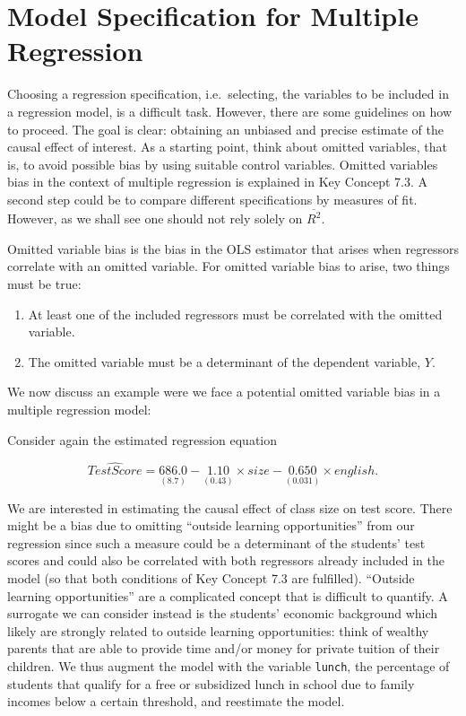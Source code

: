 \documentclass[]{book}
\theoremstyle{definition}
\theoremstyle{definition}
\theoremstyle{definition}
\theoremstyle{remark}
\begin{document}
\section{Model Specification for Multiple
Regression}\label{model-specification-for-multiple-regression}

Choosing a regression specification, i.e.~selecting, the variables to be
included in a regression model, is a difficult task. However, there are
some guidelines on how to proceed. The goal is clear: obtaining an
unbiased and precise estimate of the causal effect of interest. As a
starting point, think about omitted variables, that is, to avoid
possible bias by using suitable control variables. Omitted variables
bias in the context of multiple regression is explained in Key Concept
7.3. A second step could be to compare different specifications by
measures of fit. However, as we shall see one should not rely solely on
\(\overline{R^2}\).

\begin{keyconcepts}{7.3}
Omitted variable bias is the bias in the OLS estimator that arises when regressors correlate with an omitted variable. For omitted variable bias to arise, two things must be true:\newline

\begin{enumerate}
\item At least one of the included regressors must be correlated with the omitted variable. 
\item The omitted variable must be a determinant of the dependent variable, $Y$.
\end{enumerate}

\end{keyconcepts}

We now discuss an example were we face a potential omitted variable bias
in a multiple regression model:

Consider again the estimated regression equation

\[ \widehat{TestScore} = \underset{(8.7)}{686.0} - \underset{(0.43)}{1.10} \times size - \underset{(0.031)}{0.650} \times english. \]

We are interested in estimating the causal effect of class size on test
score. There might be a bias due to omitting ``outside learning
opportunities'' from our regression since such a measure could be a
determinant of the students' test scores and could also be correlated
with both regressors already included in the model (so that both
conditions of Key Concept 7.3 are fulfilled). ``Outside learning
opportunities'' are a complicated concept that is difficult to quantify.
A surrogate we can consider instead is the students' economic background
which likely are strongly related to outside learning opportunities:
think of wealthy parents that are able to provide time and/or money for
private tuition of their children. We thus augment the model with the
variable \texttt{lunch}, the percentage of students that qualify for a
free or subsidized lunch in school due to family incomes below a certain
threshold, and reestimate the model.
\end{document}
